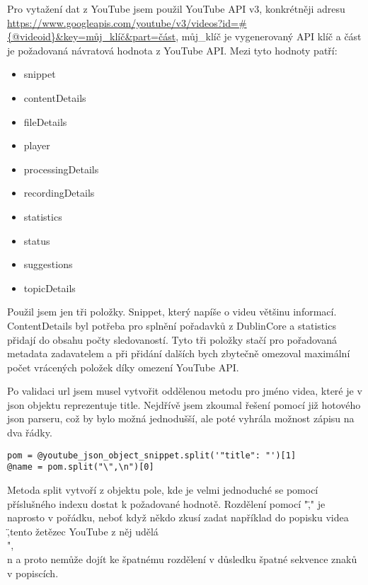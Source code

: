 \par Pro vytažení dat z YouTube jsem použil YouTube API v3, konkrétněji adresu \url{https://www.googleapis.com/youtube/v3/videos?id=#{@videoid}&key=můj\_klíč&part=část}, můj\_klíč je vygenerovaný API klíč a část je požadovaná návratová hodnota z YouTube API. Mezi tyto hodnoty patří:
\begin{itemize} 
\item{snippet}
\item{contentDetails}
\item{fileDetails}
\item{player}
\item{processingDetails}
\item{recordingDetails}
\item{statistics}
\item{status}
\item{suggestions}
\item{topicDetails}
\end{itemize}
\par Použil jsem jen tři položky. Snippet, který napíše o videu většinu informací. ContentDetails byl potřeba pro splnění pořadavků z DublinCore a statistics přidají do obsahu počty sledovaností. Tyto tři položky stačí pro pořadovaná metadata zadavatelem a při přidání dalších bych zbytečně omezoval maximální počet vrácených položek díky omezení YouTube API.
\par Po validaci url jsem musel vytvořit oddělenou metodu pro jméno videa, které je v json objektu reprezentuje title. Nejdřívě jsem zkoumal řešení pomocí již hotového json parseru, což by bylo možná jednodušší, ale poté vyhrála možnost zápisu na dva řádky.
\begin{verbatim}
pom = @youtube_json_object_snippet.split('"title": "')[1]
@name = pom.split("\",\n")[0]
\end{verbatim}
\par Metoda split vytvoří z objektu pole, kde je velmi jednoduché se pomocí příslušného indexu dostat k požadované hodnotě. Rozdělení pomocí "\",\n" je naprosto v pořádku, neboť když někdo zkusí zadat například do popisku videa \",\n tento žetězec YouTube z něj udělá \\",\\n a proto nemůže dojít ke špatnému rozdělení v důsledku špatné sekvence znaků v popiscích. 